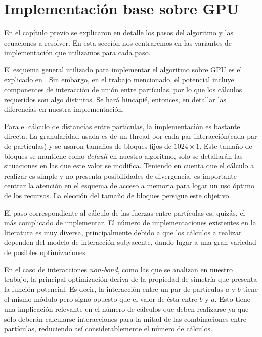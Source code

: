 



\section{Implementación base sobre GPU}
En el capítulo previo se explicaron en detalle los pasos del algoritmo y las ecuaciones a resolver. En esta sección nos centraremos en las variantes de implementación que utilizamos para cada paso.

El esquema general utilizado para implementar el algoritmo sobre GPU es el explicado en \cite{friedrichs2009accelerating}. 
Sin embargo, en el trabajo mencionado, el potencial incluye componentes de interacción de unión entre partículas, por lo que los cálculos requeridos son algo distintos. 
Se hará hincapié, entonces, en detallar las diferencias en nuestra implementación.

Para el cálculo de distancias entre partículas, la implementación es bastante directa. La granularidad usada es de un thread por cada par interacción(cada par de partículas) y se usaron tamaños de bloques fijos de $1024\times1$.
Este tamaño de bloques se mantiene como \textit{default} en nuestro algoritmo, solo se detallarán las situaciones en las que este valor se modifica.
Teniendo en cuenta que el cálculo a realizar es simple y no presenta posibilidades de divergencia, es importante centrar la atención en el esquema de acceso a memoria para logar un uso óptimo de los recursos.
La elección del tamaño de bloques persigue este objetivo.

El paso correspondiente al cálculo de las fuerzas entre partículas es, quizás, el más complicado de implementar. El número de implementaciones existentes en la literatura es muy diversa, 
principalmente debido a que los cálculos a realizar dependen del modelo de interacción subyacente, dando lugar a una gran variedad de posibles optimizaciones \cite{friedrichs2009accelerating}\cite{gotz2012routine}\cite{salomon2013routine}.

En el caso de interacciones \textit{non-bond}, como las que se analizan en nuestro trabajo, la principal optimización deriva de la propiedad de simetría que presenta la función potencial.
Es decir, la interacción entre un par de partículas $a$ y $b$ tiene el mismo módulo pero signo opuesto que el valor de ésta entre $b$ y $a$. 
Esto tiene una implicación relevante en el número de cálculos que deben realizarse ya que sólo deberán calcularse interacciones para la mitad de las combinaciones entre partículas, reduciendo así considerablemente el número de cálculos.

